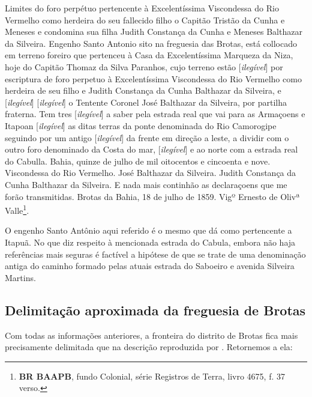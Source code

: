 \begin{citacao}
\begin{citacao}
Limites do foro perpétuo pertencente à Excelentíssima Viscondessa do Rio Vermelho como herdeira do seu fallecido filho o Capitão Tristão da Cunha e Meneses e condomina sua filha Judith Constança da Cunha e Meneses Balthazar da Silveira. Engenho Santo Antonio sito na freguesia das Brotas, está collocado em terreno foreiro que pertenceu à Casa da Excelentíssima Marqueza da Niza, hoje do Capitão Thomaz da Silva Paranhos, cujo terreno estão [\textit{ilegível}] por escriptura de foro perpetuo à Excelentíssima Viscondessa do Rio Vermelho como herdeira de seu filho e Judith Constança da Cunha Balthazar da Silveira, e [\textit{ilegível}] [\textit{ilegível}] o Tentente Coronel José Balthazar da Silveira, por partilha fraterna. Tem tres [\textit{ilegível}] a saber pela estrada real que vai para as Armaçoens e Itapoan [\textit{ilegível}] as ditas terras da ponte denominada do Rio Camorogipe seguindo por um antigo [\textit{ilegível}] da frente em direção a leste, a dividir com o outro foro denominado da Costa do mar, [\textit{ilegível}] e ao norte com a estrada real do Cabulla. Bahia, quinze de julho de mil oitocentos e cincoenta e nove. Viscondessa do Rio Vermelho. José Balthazar da Silveira. Judith Constança da Cunha Balthazar da Silveira. E nada mais continhão as declaraçoens que me forão transmitidas. Brotas da Bahia, 18 de julho de 1859. Vigº Ernesto de Olivª Valle\footnote{\textbf{BR BAAPB}, fundo Colonial, série Registros de Terra, livro 4675, f. 37 verso.}.
\end{citacao}

O engenho Santo Antônio aqui referido é o mesmo que  dá como pertencente a Itapuã. No que diz respeito à mencionada estrada do Cabula, embora não haja referências mais seguras é factível a hipótese de que se trate de uma denominação antiga do caminho formado pelas atuais estrada do Saboeiro e avenida Silveira Martins.

\subsection{Delimitação aproximada da freguesia de Brotas}

Com todas as informações anteriores, a fronteira do distrito de Brotas fica mais precisamente delimitada que na descrição reproduzida por . Retornemos a ela:


\end{citacao}
